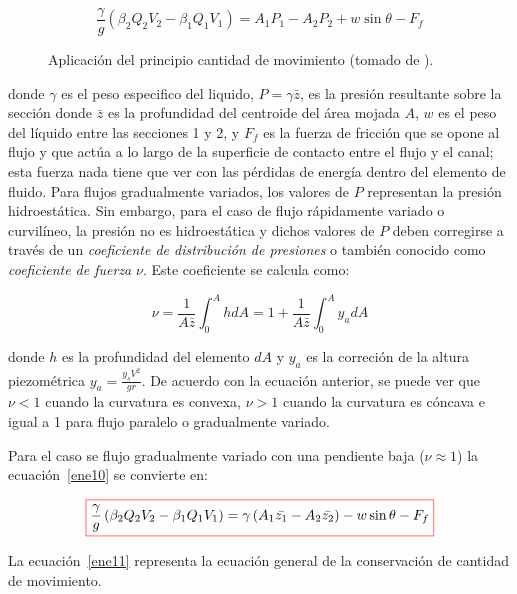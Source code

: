 \documentclass[11pt, oneside]{article}
\begin{document}
\begin{equation}
\frac{\gamma}{g}\left(\beta_2 Q_2 V_2 - \beta_1 Q_1 V_1 \right) = A_1 P_1 - A_2 P_2 + w \sin \theta - F_f
\label{ene10}
\end{equation}

\begin{figure}[h]
\centering
\caption{Aplicaci\'on del principio  cantidad de movimiento (tomado de \cite{VChow}).}
\label{fig11}
\end{figure}


donde $\gamma$ es el peso especifico del liquido, $P=\gamma \bar{z}$, es la presi\'on resultante sobre la secci\'on donde $\bar{z}$ es la  profundidad del centroide del \'area mojada $A$, $w$ es el peso del l\'iquido entre las secciones 1 y 2, y $F_f$ es la fuerza de fricci\'on que se opone al flujo y que act\'ua a lo largo de la superficie de contacto entre el flujo y el canal; esta fuerza nada tiene que ver con las p\'erdidas de energ\'ia dentro del elemento de fluido. Para flujos gradualmente variados, los valores de $P$ representan la presi\'on hidroest\'atica. Sin embargo, para el caso de flujo r\'apidamente variado o curvil\'ineo, la presi\'on no es hidroest\'atica y dichos valores de $P$ deben corregirse a trav\'es de un \emph{coeficiente de distribuci\'on de presiones} o tambi\'en conocido como \emph{coeficiente de fuerza} $\nu$. Este coeficiente se calcula como: 

$$
\nu = \frac{1}{A\bar{z}} \int_0^A h dA = 1 + \frac{1}{A\bar{z}} \int_0^A y_a dA
$$

donde $h$ es la profundidad del elemento $dA$ y $y_a$ es la correci\'on de la altura piezom\'etrica $y_a=\frac{y_s V^2}{gr}$. De acuerdo con la ecuaci\'on anterior, se puede ver que $\nu < 1$ cuando la curvatura es convexa, $\nu > 1$ cuando la curvatura es c\'oncava e igual a 1 para flujo paralelo o gradualmente variado. 

Para el caso se flujo gradualmente variado con una pendiente baja ($\nu \approx 1$) la ecuaci\'on~\ref{ene10} se convierte en:

\begin{equation}
\color{red}\boxed{\color{black} \frac{\gamma}{g}\left(\beta_2 Q_2 V_2 - \beta_1 Q_1 V_1 \right) = \gamma \left( A_1 \bar{z_1} - A_2 \bar{z_2} \right) - w \sin \theta - F_f}
\label{ene11}
\end{equation}

La ecuaci\'on~\ref{ene11} representa la ecuaci\'on general de la conservaci\'on de cantidad de movimiento. 
\end{document}

